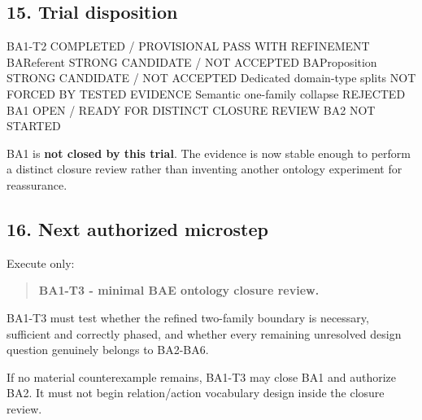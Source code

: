 \documentclass[
  10pt,
]{article}
\newenvironment{Shaded}{}{}
\newcommand{\NormalTok}[1]{#1}
\begin{document}
\subsection{15. Trial disposition}\label{trial-disposition}

\begin{Shaded}
\begin{Highlighting}[]
\NormalTok{BA1{-}T2                         COMPLETED / PROVISIONAL PASS WITH REFINEMENT}
\NormalTok{BAReferent                     STRONG CANDIDATE / NOT ACCEPTED}
\NormalTok{BAProposition                  STRONG CANDIDATE / NOT ACCEPTED}
\NormalTok{Dedicated domain{-}type splits   NOT FORCED BY TESTED EVIDENCE}
\NormalTok{Semantic one{-}family collapse   REJECTED}
\NormalTok{BA1                            OPEN / READY FOR DISTINCT CLOSURE REVIEW}
\NormalTok{BA2                            NOT STARTED}
\end{Highlighting}
\end{Shaded}

BA1 is \textbf{not closed by this trial}. The evidence is now stable
enough to perform a distinct closure review rather than inventing
another ontology experiment for reassurance.

\subsection{16. Next authorized
microstep}\label{next-authorized-microstep}

Execute only:

\begin{quote}
\textbf{BA1-T3 - minimal BAE ontology closure review.}
\end{quote}

BA1-T3 must test whether the refined two-family boundary is necessary,
sufficient and correctly phased, and whether every remaining unresolved
design question genuinely belongs to BA2-BA6.

If no material counterexample remains, BA1-T3 may close BA1 and
authorize BA2. It must not begin relation/action vocabulary design
inside the closure review.
\end{document}
